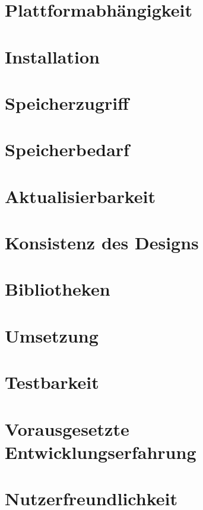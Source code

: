 \section{Plattformabhängigkeit} \label{sec:6-plattform}


\section{Installation} \label{sec:6-installation}


\section{Speicherzugriff} \label{sec:6-speicherzugriff}


\section{Speicherbedarf} \label{sec:6-speicherbedarf}


\section{Aktualisierbarkeit} \label{sec:6-aktualisierbarkeit}


\section{Konsistenz des Designs} \label{sec:6-konsistenz-des-designs}


\section{Bibliotheken} \label{sec:6-bibliotheken}


\section{Umsetzung} \label{sec:6-umsetzung}


\section{Testbarkeit} \label{sec:6-testbarkeit}


\section{Vorausgesetzte Entwicklungserfahrung} \label{sec:6-vorausgesetzte-entwicklungserfahrung}


\section{Nutzerfreundlichkeit} \label{sec:6-verstaendlichkeit}
